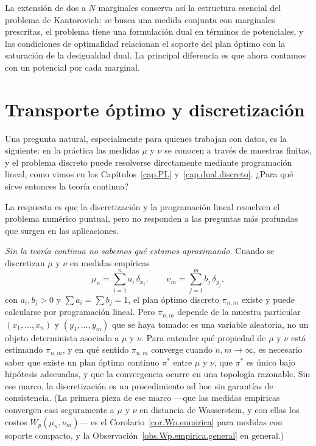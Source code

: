 \documentclass[12pt, a4paper]{amsbook}
\theoremstyle{remark}
\theoremstyle{definition}
\numberwithin{section}{chapter}
\numberwithin{subsection}{section}
\numberwithin{equation}{section}
\numberwithin{figure}{chapter}
\begin{document}
La extensión de dos a $N$ marginales conserva así la estructura esencial
del problema de Kantorovich: se busca una medida conjunta con marginales
prescritas, el problema tiene una formulación dual en términos de potenciales,
y las condiciones de optimalidad relacionan el soporte del plan óptimo con la
saturación de la desigualdad dual. La principal diferencia es que ahora
contamos con un potencial por cada marginal.

\section{Transporte óptimo y discretización}\label{sec.discretizacion}

Una pregunta natural, especialmente para quienes trabajan con datos, es la
siguiente: en la práctica las medidas $\mu$ y $\nu$ se conocen a través de
muestras finitas, y el problema discreto puede resolverse directamente
mediante programación lineal, como vimos en los Capítulos~\ref{cap.PL}
y~\ref{cap.dual.discreto}. ¿Para qué sirve entonces la teoría continua?

La respuesta es que la discretización y la programación lineal resuelven el
problema numérico puntual, pero no responden a las preguntas más profundas
que surgen en las aplicaciones.

\medskip
\emph{Sin la teoría continua no sabemos qué estamos aproximando.}
Cuando se discretizan $\mu$ y $\nu$ en medidas empíricas
\[
\mu_n=\sum_{i=1}^n a_i\,\delta_{x_i},
\qquad
\nu_m=\sum_{j=1}^m b_j\,\delta_{y_j},
\]
con $a_i,b_j>0$ y $\sum a_i=\sum b_j=1$, el plan óptimo discreto
$\pi_{n,m}$ existe y puede calcularse por programación lineal. Pero
$\pi_{n,m}$ depende de la muestra particular $(x_1,\ldots,x_n)$ y
$(y_1,\ldots,y_m)$ que se haya tomado: es una variable aleatoria, no
un objeto determinista asociado a $\mu$ y $\nu$. Para entender qué
propiedad de $\mu$ y $\nu$ está estimando $\pi_{n,m}$, y en qué
sentido $\pi_{n,m}$ converge cuando $n,m\to\infty$, es necesario saber
que existe un plan óptimo continuo $\pi^*$ entre $\mu$ y $\nu$, que
$\pi^*$ es único bajo hipótesis adecuadas, y que la convergencia ocurre
en una topología razonable. Sin ese marco, la discretización es un
procedimiento ad hoc sin garantías de consistencia. (La primera pieza de
ese marco —que las medidas empíricas convergen casi seguramente a $\mu$ y
$\nu$ en distancia de Wasserstein, y con ellas los costos $W_p(\mu_n,\nu_m)$— es el
Corolario~\ref{cor.Wp.empirica} para medidas con soporte compacto, y la
Observación~\ref{obs.Wp.empirica.general} en general.)
\end{document}
